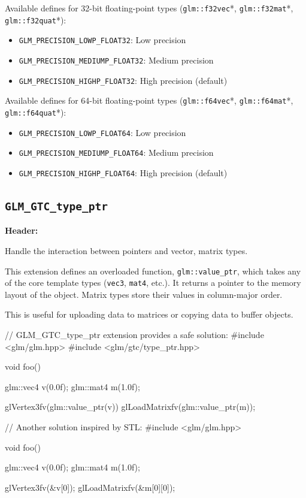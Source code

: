 \documentclass{scrartcl}
\numberwithin{figure}{subsection}
\begin{document}
Available defines for 32-bit floating-point types (\verb|glm::f32vec|*, \verb|glm::f32mat|*, \verb|glm::f32quat|*):

\begin{itemize}
    \item \verb|GLM_PRECISION_LOWP_FLOAT32|: Low precision
    \item \verb|GLM_PRECISION_MEDIUMP_FLOAT32|: Medium precision
    \item \verb|GLM_PRECISION_HIGHP_FLOAT32|: High precision (default)
\end{itemize}

Available defines for 64-bit floating-point types (\verb|glm::f64vec|*, \verb|glm::f64mat|*, \verb|glm::f64quat|*):

\begin{itemize}
    \item \verb|GLM_PRECISION_LOWP_FLOAT64|: Low precision
    \item \verb|GLM_PRECISION_MEDIUMP_FLOAT64|: Medium precision
    \item \verb|GLM_PRECISION_HIGHP_FLOAT64|: High precision (default)
\end{itemize}

\subsection{\texttt{GLM\_GTC\_type\_ptr}}
\textbf{Header:} 

Handle the interaction between pointers and vector, matrix types.

This extension defines an overloaded function, \verb|glm::value_ptr|, which takes any of the core template types (\verb|vec3|, \verb|mat4|, etc.). It returns a pointer to the memory layout of the object. Matrix types store their values in column-major order.

This is useful for uploading data to matrices or copying data to buffer objects.

\begin{cppcode}
// GLM_GTC_type_ptr extension provides a safe solution:
#include <glm/glm.hpp>
#include <glm/gtc/type_ptr.hpp>

void foo()
{
  glm::vec4 v(0.0f);
  glm::mat4 m(1.0f);

  glVertex3fv(glm::value_ptr(v)) 
  glLoadMatrixfv(glm::value_ptr(m));
}
\end{cppcode}

\begin{cppcode}
// Another solution inspired by STL:
#include <glm/glm.hpp>

void foo()
{
  glm::vec4 v(0.0f);
  glm::mat4 m(1.0f);

  glVertex3fv(&v[0]);
  glLoadMatrixfv(&m[0][0]);
}
\end{cppcode}
\end{document}
